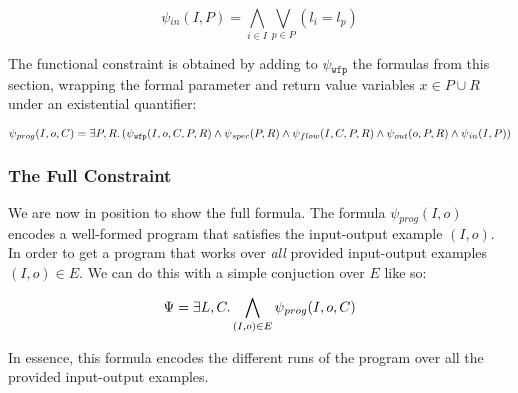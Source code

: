 \[
  \psi{}_{in}(I, P) = \bigwedge_{i \in I}\bigvee_{p \in P}(l_i = l_p)
\]

The functional constraint is obtained by adding to $\psi{}_{\mathtt{wfp}}$ the
formulas from this section, wrapping the formal parameter and return value
variables $x \in P \cup R$ under an existential quantifier:

\[
  \psi{}_{prog}(I, o, C) = \exists P,R\ldotp
  (\psi{}_{\mathtt{wfp}}(I, o, C, P, R) \wedge
  \psi{}_{spec}(P, R) \wedge
  \psi{}_{flow}(I, C, P, R) \wedge 
  \psi{}_{out}(o, P, R) \wedge
  \psi{}_{in}(I, P))
\]


\subsubsection{The Full Constraint}
\label{sec:full-constraint}

We are now in position to show the full formula. The formula $\psi{}_{prog}(I,
o)$ encodes a well-formed program that satisfies the input-output example $(I,
o)$. In order to get a program that works over \textit{all} provided
input-output examples $(I, o) \in E$. We can do this with a simple conjuction
over $E$ like so:

\[
  \Psi{} = \exists L,C\ldotp \bigwedge_{(I, o) \in E}\psi{}_{prog}(I, o, C)
\]

\noindent
In essence, this formula encodes the different runs of the program over all
the provided input-output examples. 









